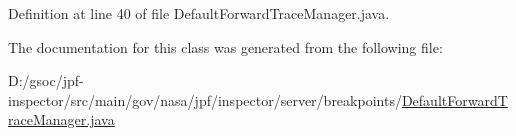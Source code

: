 Definition at line 40 of file Default\+Forward\+Trace\+Manager.\+java.



The documentation for this class was generated from the following file\+:\begin{DoxyCompactItemize}
\item 
D\+:/gsoc/jpf-\/inspector/src/main/gov/nasa/jpf/inspector/server/breakpoints/\hyperlink{_default_forward_trace_manager_8java}{Default\+Forward\+Trace\+Manager.\+java}\end{DoxyCompactItemize}
